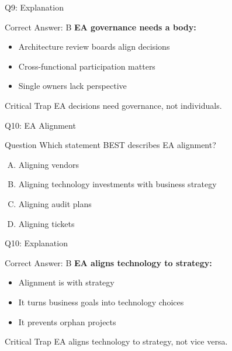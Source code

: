 \documentclass{beamer}
\begin{document}
	\begin{frame}{Q9: Explanation}
		\begin{block}{Correct Answer: B}
			\textbf{EA governance needs a body:}
			\begin{itemize}
				\item Architecture review boards align decisions
				\item Cross-functional participation matters
				\item Single owners lack perspective
			\end{itemize}
		\end{block}
		\begin{alertblock}{Critical Trap}
			EA decisions need governance, not individuals.
		\end{alertblock}
	\end{frame}
	
	\begin{frame}{Q10: EA Alignment}
		\begin{block}{Question}
			Which statement BEST describes EA alignment?
		\end{block}
		\begin{enumerate}[(A)]
			\item Aligning vendors
			\item Aligning technology investments with business strategy
			\item Aligning audit plans
			\item Aligning tickets
		\end{enumerate}
	\end{frame}
	
	\begin{frame}{Q10: Explanation}
		\begin{block}{Correct Answer: B}
			\textbf{EA aligns technology to strategy:}
			\begin{itemize}
				\item Alignment is with strategy
				\item It turns business goals into technology choices
				\item It prevents orphan projects
			\end{itemize}
		\end{block}
		\begin{alertblock}{Critical Trap}
			EA aligns technology to strategy, not vice versa.
		\end{alertblock}
	\end{frame}
	
\end{document}
